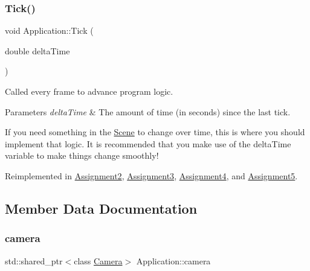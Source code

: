 \hypertarget{class_application_a0800afd5651153d31fa775a8048d14dd}{}\label{class_application_a0800afd5651153d31fa775a8048d14dd} 
\subsubsection{\texorpdfstring{Tick()}{Tick()}}
{\footnotesize\ttfamily void Application\+::\+Tick (\begin{DoxyParamCaption}\item[{double}]{delta\+Time }\end{DoxyParamCaption})\hspace{0.3cm}{\ttfamily [virtual]}}



Called every frame to advance program logic. 


\begin{DoxyParams}{Parameters}
{\em delta\+Time} & The amount of time (in seconds) since the last tick.\\
\hline
\end{DoxyParams}
If you need something in the \hyperlink{class_scene}{Scene} to change over time, this is where you should implement that logic. It is recommended that you make use of the delta\+Time variable to make things change smoothly! 

Reimplemented in \hyperlink{class_assignment2_a41544ad361dd798d5fae1ec3197fc66e}{Assignment2}, \hyperlink{class_assignment3_a11256b6e7b38ab24baa92729cfb8ffe2}{Assignment3}, \hyperlink{class_assignment4_a3ef3fef7a6ae13603bc453b29e079c5d}{Assignment4}, and \hyperlink{class_assignment5_a34cdf7bc962c3a0e3959c77a24c54d79}{Assignment5}.



\subsection{Member Data Documentation}
\hypertarget{class_application_a0e8589fcb13c520ba472473abe5a518d}{}\label{class_application_a0e8589fcb13c520ba472473abe5a518d} 
\subsubsection{\texorpdfstring{camera}{camera}}
{\footnotesize\ttfamily std\+::shared\+\_\+ptr$<$class \hyperlink{class_camera}{Camera}$>$ Application\+::camera\hspace{0.3cm}{\ttfamily [protected]}}



